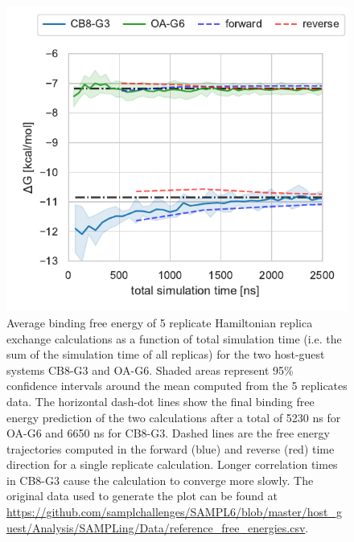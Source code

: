 \documentclass[9pt,bestpractices,pubversion]{livecoms}
\begin{document}
\begin{figure}
    \includegraphics[width=0.90\linewidth]{figures/fig9_convergence/Figure.pdf}
    \caption{Average binding free energy of 5 replicate Hamiltonian replica exchange calculations as a function of total simulation time (i.e. the sum of the simulation time of all replicas) for the two host-guest systems CB8-G3 and OA-G6. Shaded areas represent 95\% confidence intervals around the mean computed from the 5 replicates data. The horizontal dash-dot lines show the final binding free energy prediction of the two calculations after a total of 5230 ns for OA-G6 and 6650 ns for CB8-G3. Dashed lines are the free energy trajectories computed in the forward (blue) and reverse (red) time direction for a single replicate calculation. Longer correlation times in CB8-G3 cause the calculation to converge more slowly. The original data used to generate the plot can be found at \url{https://github.com/samplchallenges/SAMPL6/blob/master/host_guest/Analysis/SAMPLing/Data/reference_free_energies.csv}.
}
    \label{fig:freeenergytrajectories}
\end{figure}
\end{document}
